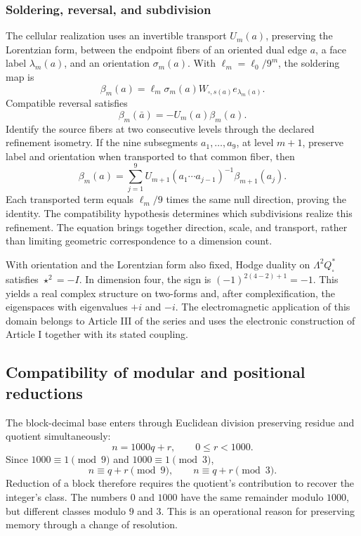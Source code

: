 \subsubsection{Soldering, reversal, and subdivision}

The cellular realization uses an invertible transport \(U_m(a)\),
preserving the Lorentzian form, between the endpoint fibers of an
oriented dual edge \(a\), a face label \(\lambda_m(a)\),
and an orientation \(\sigma_m(a)\).
With \(\ell_m=\ell_0/9^m\), the soldering map is
\[
 \beta_m(a)=\ell_m\sigma_m(a)
 W_{\square,s(a)}e_{\lambda_m(a)}.
\]
Compatible reversal satisfies
\[
 \beta_m(\bar a)=-U_m(a)\beta_m(a).
\]
Identify the source fibers at two consecutive levels through the declared
refinement isometry. If the nine subsegments \(a_1,\ldots,a_9\),
at level \(m+1\), preserve label and orientation when transported
to that common fiber, then
\begin{equation}
 \beta_m(a)=\sum_{j=1}^9
 U_{m+1}(a_1\cdots a_{j-1})^{-1}\beta_{m+1}(a_j).
 \label{eq:soldadura-refinamiento}
\end{equation}
Each transported term equals \(\ell_m/9\) times the same null
direction, proving the identity. The compatibility hypothesis determines
which subdivisions realize this refinement. The equation brings together
direction, scale, and transport, rather than limiting geometric
correspondence to a dimension count.

With orientation and the Lorentzian form also fixed, Hodge duality
on \(\Lambda^2Q_\square^*\) satisfies \(\star^2=-I\).
In dimension four, the sign is \((-1)^{2(4-2)+1}=-1\).
This yields a real complex structure on two-forms and, after
complexification, the eigenspaces with eigenvalues \(+i\) and \(-i\).
The electromagnetic application of this domain belongs to Article III of
the series and uses the electronic construction of Article I together
with its stated coupling.

\subsection{Compatibility of modular and positional reductions}

The block-decimal base enters through Euclidean division preserving
residue and quotient simultaneously:
\[
 n=1000q+r,\qquad 0\le r<1000.
\]
Since \(1000\equiv1\pmod9\) and \(1000\equiv1\pmod3\),
\[
 n\equiv q+r\pmod9,\qquad n\equiv q+r\pmod3.
\]
Reduction of a block therefore requires the quotient's contribution
to recover the integer's class. The numbers \(0\) and \(1000\)
have the same remainder modulo \(1000\), but different classes
modulo \(9\) and \(3\). This is an operational reason for preserving
memory through a change of resolution.

